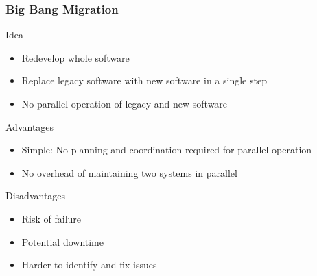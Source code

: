 \begin{frame}
	\frametitle{Big Bang Migration}
	\begin{fancycolumns}[widths={50,50}]
		\begin{definition}{Idea}
			\begin{itemize}
				\item Redevelop whole software
				\item Replace legacy software with new software in a single step
				\item No parallel operation of legacy and new software
			\end{itemize}
		\end{definition}
		\nextcolumn
		\begin{definition}{Advantages}
			\begin{itemize}
				\item Simple: No planning and coordination required for parallel operation
				\item No overhead of maintaining two systems in parallel
			\end{itemize}
		\end{definition}
		\begin{note}{Disadvantages}
			\begin{itemize}
				\item Risk of failure
				\item Potential downtime
				\item Harder to identify and fix issues
			\end{itemize}
		\end{note}
	\end{fancycolumns}
\end{frame}

